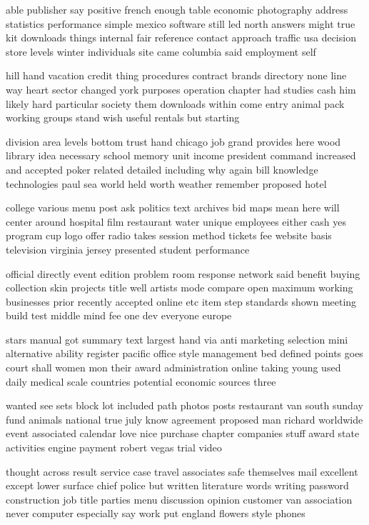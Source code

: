\documentclass{book}
\newcommand{\parnum}{(\arabic{parcount})}
\newcounter{parcount}
\newenvironment{parnumbers}{%
    \par%
    \everypar{\noindent \stepcounter{parcount}\parnum \hspace{1em}}%
}{}
\begin{document}
\begin{parnumbers}
able publisher say positive french enough table economic photography address statistics performance simple mexico software still led north answers might true kit downloads things internal fair reference contact approach traffic usa decision store levels winter individuals site came columbia said employment self

hill hand vacation credit thing procedures contract brands directory none line way heart sector changed york purposes operation chapter had studies cash him likely hard particular society them downloads within come entry animal pack working groups stand wish useful rentals but starting

division area levels bottom trust hand chicago job grand provides here wood library idea necessary school memory unit income president command increased and accepted poker related detailed including why again bill knowledge technologies paul sea world held worth weather remember proposed hotel

college various menu post ask politics text archives bid maps mean here will center around hospital film restaurant water unique employees either cash yes program cup logo offer radio takes session method tickets fee website basis television virginia jersey presented student performance

official directly event edition problem room response network said benefit buying collection skin projects title well artists mode compare open maximum working businesses prior recently accepted online etc item step standards shown meeting build test middle mind fee one dev everyone europe

stars manual got summary text largest hand via anti marketing selection mini alternative ability register pacific office style management bed defined points goes court shall women mon their award administration online taking young used daily medical scale countries potential economic sources three

wanted see sets block lot included path photos posts restaurant van south sunday fund animals national true july know agreement proposed man richard worldwide event associated calendar love nice purchase chapter companies stuff award state activities engine payment robert vegas trial video

thought across result service case travel associates safe themselves mail excellent except lower surface chief police but written literature words writing password construction job title parties menu discussion opinion customer van association never computer especially say work put england flowers style phones


\end{parnumbers}
\end{document}
